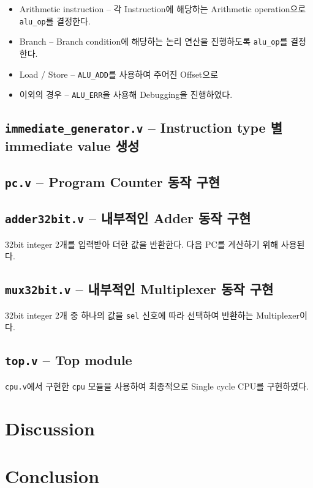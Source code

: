 \documentclass{scrartcl}
\begin{document}
\begin{itemize}
  \item Arithmetic instruction -- 각 Instruction에 해당하는 Arithmetic operation으로 \texttt{alu\_op}를 결정한다.
  \item Branch -- Branch condition에 해당하는 논리 연산을 진행하도록 \texttt{alu\_op}를 결정한다.
  \item Load / Store -- \texttt{ALU\_ADD}를 사용하여 주어진 Offset으로
  \item 이외의 경우 -- \texttt{ALU\_ERR}을 사용해 Debugging을 진행하였다.
\end{itemize}

\subsection{\texttt{immediate\_generator.v} -- Instruction type 별 immediate value 생성}

\subsection{\texttt{pc.v} -- Program Counter 동작 구현}

\subsection{\texttt{adder32bit.v} -- 내부적인 Adder 동작 구현}
32bit integer 2개를 입력받아 더한 값을 반환한다. 다음 PC를 계산하기 위해 사용된다.

\subsection{\texttt{mux32bit.v} -- 내부적인 Multiplexer 동작 구현}
32bit integer 2개 중 하나의 값을 \texttt{sel} 신호에 따라 선택하여 반환하는 Multiplexer이다.

\subsection{\texttt{top.v} -- Top module}
\texttt{cpu.v}에서 구현한 \texttt{cpu} 모듈을 사용하여 최종적으로 Single cycle CPU를 구현하였다.

\section{Discussion}

\section{Conclusion}
\end{document}
